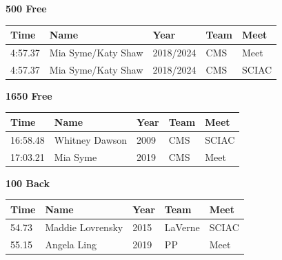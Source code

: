 \vspace{1.2em}
\noindent\begin{minipage}[t]{0.98\textwidth}
\centering
\textbf{\textcolor{teamprimary}{500 Free}}\par
\vspace{0.5em}
\centering
\small
\renewcommand{\arraystretch}{1.0}
\setlength{\tabcolsep}{4pt}
\begin{tabular}{@{}p{2.5cm}p{4.5cm}p{1.5cm}p{2.5cm}p{2.5cm}@{}}
\toprule
\textbf{Time} & \textbf{Name} & \textbf{Year} & \textbf{Team} & \textbf{Meet} \\
\midrule
4:57.37 & Mia Syme/Katy Shaw & 2018/2024 & CMS & Meet \\
4:57.37 & Mia Syme/Katy Shaw & 2018/2024 & CMS & SCIAC \\
\bottomrule
\end{tabular}
\end{minipage}
\vspace{1.2em}
\noindent\begin{minipage}[t]{0.98\textwidth}
\centering
\textbf{\textcolor{teamprimary}{1650 Free}}\par
\vspace{0.5em}
\centering
\small
\renewcommand{\arraystretch}{1.0}
\setlength{\tabcolsep}{4pt}
\begin{tabular}{@{}p{2.5cm}p{4.5cm}p{1.5cm}p{2.5cm}p{2.5cm}@{}}
\toprule
\textbf{Time} & \textbf{Name} & \textbf{Year} & \textbf{Team} & \textbf{Meet} \\
\midrule
16:58.48 & Whitney Dawson & 2009 & CMS & SCIAC \\
17:03.21 & Mia Syme & 2019 & CMS & Meet \\
\bottomrule
\end{tabular}
\end{minipage}
\vspace{1.2em}
\noindent\begin{minipage}[t]{0.98\textwidth}
\centering
\textbf{\textcolor{teamprimary}{100 Back}}\par
\vspace{0.5em}
\centering
\small
\renewcommand{\arraystretch}{1.0}
\setlength{\tabcolsep}{4pt}
\begin{tabular}{@{}p{2.5cm}p{4.5cm}p{1.5cm}p{2.5cm}p{2.5cm}@{}}
\toprule
\textbf{Time} & \textbf{Name} & \textbf{Year} & \textbf{Team} & \textbf{Meet} \\
\midrule
54.73 & Maddie Lovrensky & 2015 & LaVerne & SCIAC \\
55.15 & Angela Ling & 2019 & PP & Meet \\
\bottomrule
\end{tabular}
\end{minipage}
